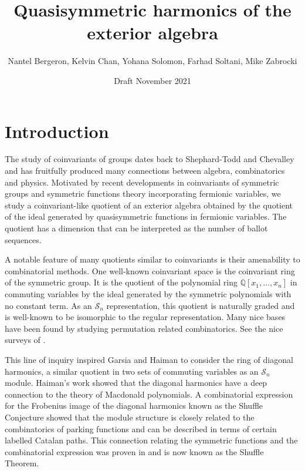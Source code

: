 \documentclass[11pt]{amsart}
\title{Quasisymmetric harmonics of the exterior algebra}
\author{Nantel Bergeron,
Kelvin Chan,
Yohana Solomon,
Farhad Soltani,
Mike Zabrocki}
\date{Draft November 2021}
\theoremstyle{definition}
\numberwithin{equation}{section}
\begin{document}
\maketitle

\section{Introduction}
The study of coinvariants of groups dates back to Shephard-Todd and Chevalley~\cite{ST,Chevalley} and has fruitfully produced many connections between algebra, combinatorics and physics.  Motivated by recent developments in coinvariants of symmetric groups and symmetric functions theory incorporating fermionic variables, we study a coinvariant-like quotient of an exterior algebra obtained by the quotient of the ideal generated by quasisymmetric functions in fermionic variables.  The quotient has a dimension that can be interpreted as the number of ballot sequences.

A notable feature of many quotients similar to coinvariants is their amenability to combinatorial methods.  One well-known coinvariant space is the coinvariant ring of the symmetric group.  It is the quotient of the polynomial ring $\mathbb{Q}[x_{1},\dots,x_{n}]$ in commuting variables by the ideal generated by the symmetric polynomials with no constant term.  As an $\mathcal{S}_{n}$ representation, this quotient is naturally graded and is well-known to be isomorphic to the regular representation.  Many nice bases have been found by studying permutation related combinatorics.  See the nice surveys of \cite{B, GH,MacSchub,Manivel}.

This line of inquiry inspired Garsia and Haiman \cite{GH96,H} to consider the ring of diagonal harmonics, a similar quotient in two sets of commuting variables as an $\mathcal{S}_{n}$ module.  Haiman's work \cite{H2} showed that the diagonal harmonics have a deep connection to the theory of Macdonald polynomials.  A combinatorial expression for the Frobenius image of the diagonal harmonics known as the Shuffle Conjecture \cite{HHLRU} showed that the module structure is closely related to the combinatorics of parking functions and can be described in terms of certain labelled Catalan paths.  This connection relating the symmetric functions and the combinatorial expression was proven in \cite{CM} and is now known as the Shuffle Theorem.
\end{document}
